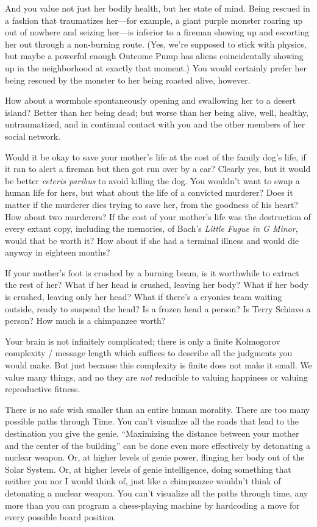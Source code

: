{
 And you value not just her bodily health, but her state of mind.
Being rescued in a fashion that traumatizes her---for example, a giant
purple monster roaring up out of nowhere and seizing her---is inferior
to a fireman showing up and escorting her out through a non-burning
route. (Yes, we're supposed to stick with physics, but
maybe a powerful enough Outcome Pump has aliens coincidentally showing
up in the neighborhood at exactly that moment.) You would certainly
prefer her being rescued by the monster to her being roasted alive,
however.}

{
 How about a wormhole spontaneously opening and swallowing her to a
desert island? Better than her being dead; but worse than her being
alive, well, healthy, untraumatized, and in continual contact with you
and the other members of her social network.}

{
 Would it be okay to save your mother's life at the
cost of the family dog's life, if it ran to alert a
fireman but then got run over by a car? Clearly yes, but it would be
better \textit{ceteris paribus} to avoid killing the dog. You
wouldn't want to swap a human life for hers, but what
about the life of a convicted murderer? Does it matter if the murderer
dies trying to save her, from the goodness of his heart? How about two
murderers? If the cost of your mother's life was the
destruction of every extant copy, including the memories, of
Bach's \textit{Little Fugue in G Minor}, would that be
worth it? How about if she had a terminal illness and would die anyway
in eighteen months?}

{
 If your mother's foot is crushed by a burning
beam, is it worthwhile to extract the rest of her? What if her head is
crushed, leaving her body? What if her body is crushed, leaving only
her head? What if there's a cryonics team waiting
outside, ready to suspend the head? Is a frozen head a person? Is Terry
Schiavo a person? How much is a chimpanzee worth?}

{
 Your brain is not infinitely complicated; there is only a finite
Kolmogorov complexity / message length which suffices to describe all
the judgments you would make. But just because this complexity is
finite does not make it small. We value many things, and no they are
\textit{not} reducible to valuing happiness or valuing reproductive
fitness.}

{
 There is no safe wish smaller than an entire human morality. There
are too many possible paths through Time. You can't
visualize all the roads that lead to the destination you give the
genie. ``Maximizing the distance between your mother
and the center of the building'' can be done even
more effectively by detonating a nuclear weapon. Or, at higher levels
of genie power, flinging her body out of the Solar System. Or, at
higher levels of genie intelligence, doing something that neither you
nor I would think of, just like a chimpanzee wouldn't
think of detonating a nuclear weapon. You can't
visualize all the paths through time, any more than you can program a
chess-playing machine by hardcoding a move for every possible board
position.}

